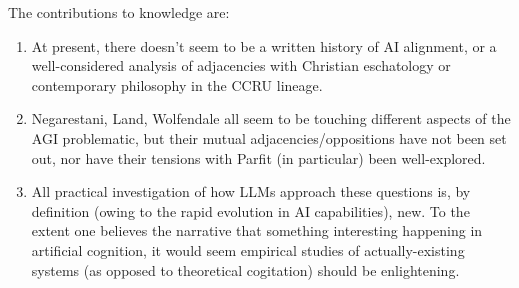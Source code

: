 \begin{abstractspacing}
\begin{enumerate}
\end{enumerate}

The contributions to knowledge are:

\begin{enumerate}
    \item At present, there doesn't seem to be a written history of AI alignment, or a well-considered analysis of adjacencies with Christian eschatology or contemporary philosophy in the CCRU lineage.
    \item Negarestani, Land, Wolfendale all seem to be touching different aspects of the AGI problematic, but their mutual adjacencies/oppositions have not been set out, nor have their tensions with Parfit (in particular) been well-explored.
    \item All practical investigation of how LLMs approach these questions is, by definition (owing to the rapid evolution in AI capabilities), new. To the extent one believes the narrative that something interesting happening in artificial cognition, it would seem empirical studies of actually-existing systems (as opposed to theoretical cogitation) should be enlightening.
\end{enumerate}

\end{abstractspacing}